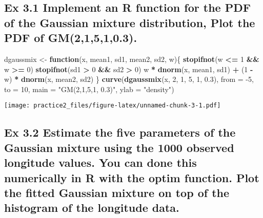 \documentclass[
]{article}
\newenvironment{Shaded}{\begin{snugshade}}{\end{snugshade}}
\newcommand{\ControlFlowTok}[1]{\textcolor[rgb]{0.13,0.29,0.53}{\textbf{#1}}}
\newcommand{\DataTypeTok}[1]{\textcolor[rgb]{0.13,0.29,0.53}{#1}}
\newcommand{\DecValTok}[1]{\textcolor[rgb]{0.00,0.00,0.81}{#1}}
\newcommand{\FloatTok}[1]{\textcolor[rgb]{0.00,0.00,0.81}{#1}}
\newcommand{\KeywordTok}[1]{\textcolor[rgb]{0.13,0.29,0.53}{\textbf{#1}}}
\newcommand{\NormalTok}[1]{#1}
\newcommand{\OperatorTok}[1]{\textcolor[rgb]{0.81,0.36,0.00}{\textbf{#1}}}
\newcommand{\StringTok}[1]{\textcolor[rgb]{0.31,0.60,0.02}{#1}}
\begin{document}
\hypertarget{ex-3.1-implement-an-r-function-for-the-pdf-of-the-gaussian-mixture-distribution-plot-the-pdf-of-gm21510.3.}{%
\subsection{Ex 3.1 Implement an R function for the PDF of the Gaussian
mixture distribution, Plot the PDF of
GM(2,1,5,1,0.3).}\label{ex-3.1-implement-an-r-function-for-the-pdf-of-the-gaussian-mixture-distribution-plot-the-pdf-of-gm21510.3.}}

\begin{Shaded}
\begin{Highlighting}[]
\NormalTok{dgaussmix <-}\StringTok{ }\ControlFlowTok{function}\NormalTok{(x, mean1, sd1, mean2, sd2, w)\{}
  \KeywordTok{stopifnot}\NormalTok{(w }\OperatorTok{<=}\StringTok{ }\DecValTok{1} \OperatorTok{&&}\StringTok{ }\NormalTok{w }\OperatorTok{>=}\StringTok{ }\DecValTok{0}\NormalTok{)}
  \KeywordTok{stopifnot}\NormalTok{(sd1 }\OperatorTok{>}\StringTok{ }\DecValTok{0} \OperatorTok{&&}\StringTok{ }\NormalTok{sd2 }\OperatorTok{>}\StringTok{ }\DecValTok{0}\NormalTok{)}
\NormalTok{  w }\OperatorTok{*}\StringTok{ }\KeywordTok{dnorm}\NormalTok{(x, mean1, sd1) }\OperatorTok{+}\StringTok{ }\NormalTok{(}\DecValTok{1} \OperatorTok{-}\StringTok{ }\NormalTok{w) }\OperatorTok{*}\StringTok{ }\KeywordTok{dnorm}\NormalTok{(x, mean2, sd2)}
\NormalTok{\}}
\KeywordTok{curve}\NormalTok{(}\KeywordTok{dgaussmix}\NormalTok{(x, }\DecValTok{2}\NormalTok{, }\DecValTok{1}\NormalTok{, }\DecValTok{5}\NormalTok{, }\DecValTok{1}\NormalTok{, }\FloatTok{0.3}\NormalTok{), }\DataTypeTok{from =} \DecValTok{-5}\NormalTok{, }\DataTypeTok{to =} \DecValTok{10}\NormalTok{, }\DataTypeTok{main =} \StringTok{"GM(2,1,5,1, 0.3)"}\NormalTok{, }\DataTypeTok{ylab =} \StringTok{"density"}\NormalTok{)}
\end{Highlighting}
\end{Shaded}

\texttt{[image: practice2\_files/figure-latex/unnamed-chunk-3-1.pdf]}

\hypertarget{ex-3.2-estimate-the-uxfb01ve-parameters-of-the-gaussian-mixture-using-the-1000-observed-longitude-values.-you-can-done-this-numerically-in-r-with-the-optim-function.-plot-the-uxfb01tted-gaussian-mixture-on-top-of-the-histogram-of-the-longitude-data.}{%
\subsection{Ex 3.2 Estimate the ﬁve parameters of the Gaussian mixture
using the 1000 observed longitude values. You can done this numerically
in R with the optim function. Plot the ﬁtted Gaussian mixture on top of
the histogram of the longitude
data.}\label{ex-3.2-estimate-the-uxfb01ve-parameters-of-the-gaussian-mixture-using-the-1000-observed-longitude-values.-you-can-done-this-numerically-in-r-with-the-optim-function.-plot-the-uxfb01tted-gaussian-mixture-on-top-of-the-histogram-of-the-longitude-data.}}
\end{document}

